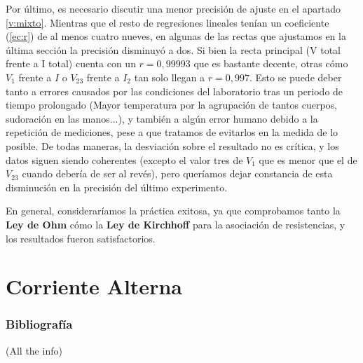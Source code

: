 \documentclass[12pt, a4paper, titlepage]{article}
\begin{document}
  Por último, es necesario discutir una menor precisión de ajuste en el apartado \ref{v:mixto}. Mientras que el resto de regresiones lineales tenían un coeficiente (\ref{ec:r}) de al menos cuatro nueves, en algunas de las rectas que ajustamos en la última sección la precisión disminuyó a dos. Si bien la recta principal (V total frente a I total) cuenta con un $r = 0,99993$ que es bastante decente, otras cómo $V_1$ frente a $I$ o $V_{23}$ frente a $I_2$ tan solo llegan a $r = 0,997$. Esto se puede deber tanto a errores causados por las condiciones del laboratorio tras un periodo de tiempo prolongado (Mayor temperatura por la agrupación de tantos cuerpos, sudoración en las manos...), y también a algún error humano debido a la repetición de mediciones, pese a que tratamos de evitarlos en la medida de lo posible. De todas maneras, la desviación sobre el resultado no es crítica, y los datos siguen siendo coherentes (excepto el valor tres de $V_1$ que es menor que el de $V_23$ cuando debería de ser al revés), pero queríamos dejar constancia de esta disminución en la precisión del último experimento.

  En general, consideraríamos la práctica exitosa, ya que comprobamos tanto la \textbf{Ley de Ohm} cómo la \textbf{Ley de Kirchhoff} para la asociación de resistencias, y los resultados fueron satisfactorios.




  \newpage
  \part{Corriente Alterna}

  \newpage
  \begin{appendices}
    \makeatletter

    \section{Bibliografía}

    (All the info)

  \end{appendices}
\end{document}

